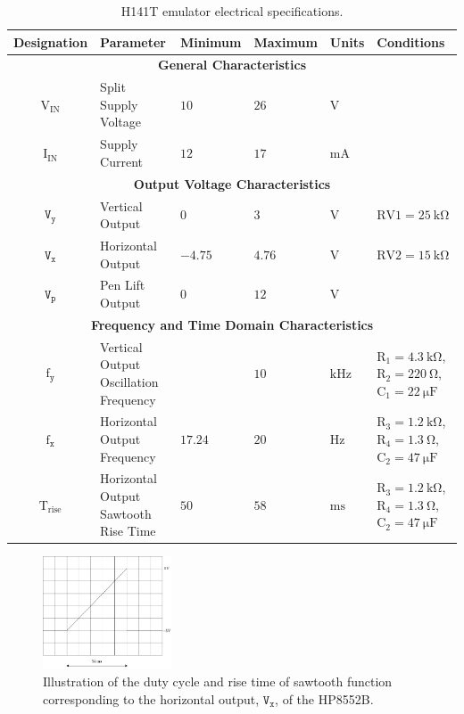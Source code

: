 \documentclass[class=report,11pt,crop=false]{standalone}
\begin{document}
	\begin{table}[ht!]
		\caption{H141T emulator electrical specifications.}
		\label{tab:vertical-output-emulator-ct-specifications}
		\centering
		\begin{tabular}{|cm{10em}m{5em}m{5em}m{5em}m{8em}|}
			\hline
			\cellcolor{cyan!25}\textbf{Designation} & \cellcolor{cyan!25}\textbf{Parameter} &	\cellcolor{cyan!25}\textbf{Minimum} &  \cellcolor{cyan!25}\textbf{Maximum}	& \cellcolor{cyan!25}\textbf{Units} & \cellcolor{cyan!25}\textbf{Conditions}\\
			\hline
			\multicolumn{6}{c}{\textbf{General Characteristics}}\\
			\hline
			$\text{V}_{\text{IN}}$ & Split Supply Voltage  & $10$ & $26$ & $\si{\volt}$ & \\
			\hline
			$\text{I}_{\text{IN}}$ & Supply Current  & $12$ & $17$ & $\si{\milli\ampere}$ & \\
			\hline
			\multicolumn{6}{c}{\textbf{Output Voltage Characteristics}}\\
			\hline
			$\texttt{V}_\texttt{y}$	& Vertical Output	&	$0$	&	$3$ & $\si{\volt}$ & $\text{RV1} = \SI{25}{\kilo\ohm}$ \\
			\hline
			$\texttt{V}_\texttt{x}$	& Horizontal Output	&	$-4.75$	&	$4.76$ & $\si{\volt}$ & $\text{RV2} = \SI{15}{\kilo\ohm}$\\
			\hline
			$\texttt{V}_\texttt{p}$	& Pen Lift Output	&   $0$	& 	$12$ & $\si{\volt}$ & \\
			\hline
			\multicolumn{6}{c}{\textbf{Frequency and Time Domain Characteristics}}\\
			\hline
			$\text{f}_\texttt{y}$	& Vertical Output Oscillation Frequency	&	&	$10$ & $\si{\kilo\hertz}$ & $\text{R}_1 = \SI{4.3}{\kilo\ohm}$, $\text{R}_2 = \SI{220}{\ohm}$, $\text{C}_1 = \SI{22}{\micro\farad}$ \\
			\hline
			$\text{f}_\texttt{x}$	& Horizontal Output Frequency	& $17.24$ 	& $20$ & $\si{\hertz}$ & $\text{R}_3 = \SI{1.2}{\kilo\ohm}$, $\text{R}_4 = \SI{1.3}{\ohm}$, $\text{C}_2 = \SI{47}{\micro\farad}$\\
			\hline
			$\text{T}_\text{rise}$				& Horizontal Output Sawtooth Rise Time	& $50$	&	$58$ &	$\si{\milli\second}$	&	$\text{R}_3 = \SI{1.2}{\kilo\ohm}$, $\text{R}_4 = \SI{1.3}{\ohm}$, $\text{C}_2 = \SI{47}{\micro\farad}$\\
			\hline
		\end{tabular}
	\end{table}
	\begin{figure}[ht!]
		\centering
		\includegraphics[width=0.34\textwidth]{Figures/Methodology/hp8552b-sawtooth}
		\caption{Illustration of the duty cycle and rise time of sawtooth function corresponding to the horizontal output, $\texttt{V}_\texttt{x}$, of the HP8552B.}
		\label{fig:hp8552b-sawtooth}
	\end{figure}
	
\end{document}
